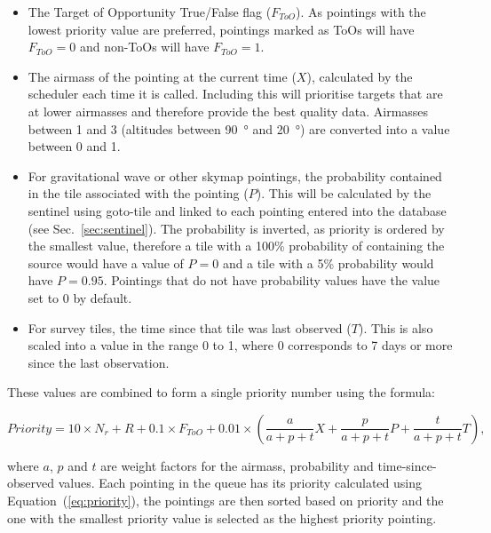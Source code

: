 \begin{colsection}
\begin{colsection}
\begin{itemize}
\item The Target of Opportunity True/False flag ($F_{ToO}$). As pointings with the lowest priority value are preferred, pointings marked as ToOs will have $F_{ToO}=0$ and non-ToOs will have $F_{ToO}=1$.

\item The airmass of the pointing at the current time ($X$), calculated by the scheduler each time it is called. Including this will prioritise targets that are at lower airmasses and therefore provide the best quality data. Airmasses between 1 and 3 (altitudes between \SI{90}{\degree} and \SI{20}{\degree}) are converted into a value between 0 and 1.

\item For gravitational wave or other skymap pointings, the probability contained in the tile associated with the pointing ($P$). This will be calculated by the sentinel using \textsf{goto-tile} and linked to each pointing entered into the database (see Sec.~\ref{sec:sentinel}). The probability is inverted, as priority is ordered by the smallest value, therefore a tile with a 100\% probability of containing the source would have a value of $P=0$ and a tile with a 5\% probability would have $P=0.95$. Pointings that do not have probability values have the value set to 0 by default.

\item For survey tiles, the time since that tile was last observed ($T$). This is also scaled into a value in the range 0 to 1, where 0 corresponds to 7 days or more since the last observation.

\end{itemize}

These values are combined to form a single priority number using the formula:

\begin{equation}
Priority = 10 \times N_r + R + 0.1 \times F_{ToO} + 0.01 \times \left(\frac{a}{a+p+t}X + \frac{p}{a+p+t}P + \frac{t}{a+p+t}T\right),
\label{eq:priority}
\end{equation}

where $a$, $p$ and $t$ are weight factors for the airmass, probability and time-since-observed values. Each pointing in the queue has its priority calculated using Equation~(\ref{eq:priority}), the pointings are then sorted based on priority and the one with the smallest priority value is selected as the highest priority pointing.


\end{colsection}
\end{colsection}

